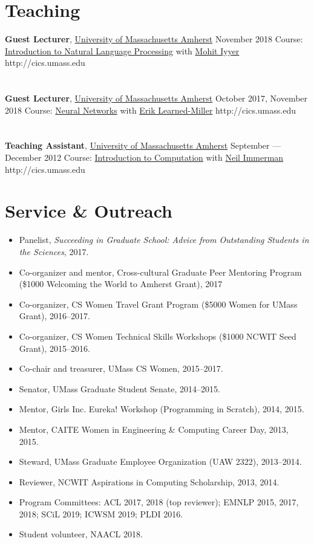 \documentclass{resume}
\begin{document}
\section{Teaching}
\employer
    {\textbf{Guest Lecturer}, \href{http://cics.umass.edu}{University of Massachusetts Amherst}}
    {November 2018}
    {Course: \href{https://people.cs.umass.edu/~miyyer/cs585/index.html}{Introduction to Natural Language Processing} with \href{http://cs.umass.edu/~miyyer}{Mohit Iyyer}} {http://cics.umass.edu}
\\ \\ \\ 
\employer
    {\textbf{Guest Lecturer}, \href{http://cics.umass.edu}{University of Massachusetts Amherst}}
    {October 2017, November 2018}
    {Course: \href{https://compsci682.github.io/syllabus.html}{Neural Networks} with \href{http://cs.umass.edu/~elm}{Erik Learned-Miller}} {http://cics.umass.edu}
\\ \\ \\ 
\employer
    {\textbf{Teaching Assistant}, \href{http://cics.umass.edu}{University of Massachusetts Amherst}}
    {September --- December 2012}
    {Course: \href{https://people.cs.umass.edu/~immerman/cs250/syllabus.html}{Introduction to Computation} with \href{http://cs.umass.edu/~immerman}{Neil Immerman}} {http://cics.umass.edu}


\section{Service \& Outreach}
\begin{itemize}
\item Panelist, \emph{Succeeding in Graduate School: Advice from Outstanding Students in the Sciences}, 2017. 
\item Co-organizer and mentor, Cross-cultural Graduate Peer Mentoring Program (\$1000 Welcoming the World to Amherst Grant), 2017
\item Co-organizer, CS Women Travel Grant Program (\$5000 Women for UMass Grant), 2016--2017.
\item Co-organizer, CS Women Technical Skills Workshops (\$1000 NCWIT Seed Grant), 2015--2016.
\item Co-chair and treasurer, UMass CS Women, 2015--2017.
\item Senator, UMass Graduate Student Senate, 2014--2015.
\item Mentor, Girls Inc. Eureka! Workshop (Programming in Scratch), 2014, 2015.
\item Mentor, CAITE Women in Engineering \& Computing Career Day, 2013, 2015.
\item Steward, UMass Graduate Employee Organization (UAW 2322), 2013--2014.
\item Reviewer, NCWIT Aspirations in Computing Scholarship, 2013, 2014.
\item Program Committees: ACL 2017, 2018 (top reviewer); EMNLP 2015, 2017, 2018; SCiL 2019; ICWSM 2019; PLDI 2016.
\item Student volunteer, NAACL 2018.
\end{itemize}
\end{document}
